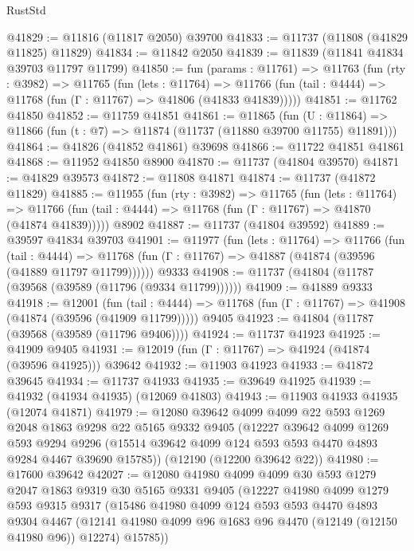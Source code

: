 \begin{lexlean}{RustStd}
\begin{coremodule}
@41829 := @11816 (@11817 @2050) @39700
@41833 := @11737 (@11808 (@41829 @11825) @11829)
@41834 := @11842 @2050
@41839 := @11839 (@11841 @41834 @39703 @11797 @11799)
@41850 := fun (params : @11761) =>
  @11763
    (fun (rty : @3982) =>
    @11765
      (fun (lets : @11764) =>
      @11766 (fun (tail : @4444) => @11768 (fun (Γ : @11767) => @41806 (@41833 @41839)))))
@41851 := @11762 @41850
@41852 := @11759 @41851
@41861 := @11865
    (fun (U : @11864) => @11866 (fun (t : @7) => @11874 (@11737 (@11880 @39700 @11755) @11891)))
@41864 := @41826 (@41852 @41861) @39698
@41866 := @11722 @41851 @41861
@41868 := @11952 @41850 @8900
@41870 := @11737 (@41804 @39570)
@41871 := @41829 @39573
@41872 := @11808 @41871
@41874 := @11737 (@41872 @11829)
@41885 := @11955
    (fun (rty : @3982) =>
    @11765
      (fun (lets : @11764) =>
      @11766 (fun (tail : @4444) => @11768 (fun (Γ : @11767) => @41870 (@41874 @41839)))))
    @8902
@41887 := @11737 (@41804 @39592)
@41889 := @39597 @41834 @39703
@41901 := @11977
    (fun (lets : @11764) =>
    @11766
      (fun (tail : @4444) =>
      @11768 (fun (Γ : @11767) => @41887 (@41874 (@39596 (@41889 @11797 @11799))))))
    @9333
@41908 := @11737 (@41804 (@11787 (@39568 (@39589 (@11796 (@9334 @11799))))))
@41909 := @41889 @9333
@41918 := @12001
    (fun (tail : @4444) => @11768 (fun (Γ : @11767) => @41908 (@41874 (@39596 (@41909 @11799)))))
    @9405
@41923 := @41804 (@11787 (@39568 (@39589 (@11796 @9406))))
@41924 := @11737 @41923
@41925 := @41909 @9405
@41931 := @12019 (fun (Γ : @11767) => @41924 (@41874 (@39596 @41925))) @39642
@41932 := @11903 @41923
@41933 := @41872 @39645
@41934 := @11737 @41933
@41935 := @39649 @41925
@41939 := @41932 (@41934 @41935) (@12069 @41803)
@41943 := @11903 @41933 @41935 (@12074 @41871)
@41979 := @12080
    @39642
    @4099
    @4099
    @22
    @593
    @1269
    @2048
    @1863
    @9298
    @22
    @5165
    @9332
    @9405
    (@12227
      @39642
      @4099
      @1269
      @593
      @9294
      @9296
      (@15514 @39642 @4099 @124 @593 @593 @4470 @4893 @9284 @4467 @39690 @15785))
    (@12190 (@12200 @39642 @22))
@41980 := @17600 @39642
@42027 := @12080
    @41980
    @4099
    @4099
    @30
    @593
    @1279
    @2047
    @1863
    @9319
    @30
    @5165
    @9331
    @9405
    (@12227
      @41980
      @4099
      @1279
      @593
      @9315
      @9317
      (@15486
        @41980
        @4099
        @124
        @593
        @593
        @4470
        @4893
        @9304
        @4467
        (@12141 @41980 @4099 @96 @1683 @96 @4470 (@12149 (@12150 @41980 @96)) @12274)
        @15785))

\end{coremodule}
\end{lexlean}
